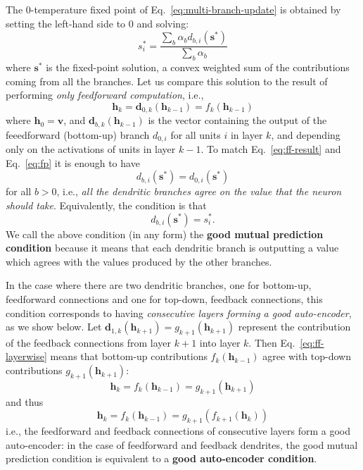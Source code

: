 \documentclass{article}
\newcommand   \vv{{\bm v}}
\newcommand   \vh{{\bm h}}
\newcommand   \vs{{\bm s}}
\newcommand   \vd{{\bm d}}
\begin{document}
The 0-temperature fixed point of Eq.~\ref{eq:multi-branch-update} is obtained
by setting the left-hand side to 0 and solving:
\begin{equation}
  \label{eq:fp}
  s^*_i = \frac{\sum_b \alpha_b d_{b,i}(\vs^*)}{\sum_b \alpha_b}
\end{equation}
where $\vs^*$ is the fixed-point solution, a convex weighted sum of the contributions
coming from all the branches.
Let us compare this solution to the result of performing {\em only feedforward
  computation}, i.e.,
\begin{equation}
  \label{eq:ff-result}
  \vh_k = \vd_{0,k}(\vh_{k-1}) = f_k(\vh_{k-1})
\end{equation}
where $\vh_0=\vv$, and $\vd_{b,k}(\vh_{k-1})$ is the vector
containing the output of the feeedforward (bottom-up) branch $d_{0,i}$ for all units $i$ in layer $k$,
and depending only on the activations of units in layer $k-1$.
To match Eq.~\ref{eq:ff-result} and Eq.~\ref{eq:fp} it is enough
to have
\begin{equation}
  \label{eq:ff-layerwise}
   d_{b,i}(\vs^*) = d_{0,i}(\vs^*)
\end{equation}
for all $b>0$, i.e., {\em all the dendritic branches agree on the
  value that the neuron should take}. Equivalently, the condition is that
\begin{equation}
  \label{eq:condition}
     d_{b,i}(\vs^*) = s^*_i.
\end{equation}
We call the above condition (in any form) the {\bf good mutual prediction condition}
because it means that each dendritic branch is outputting a value which agrees with
the values produced by the other branches.

In the case where there are two dendritic branches, one for bottom-up, feedforward connections
and one for top-down, feedback connections, this condition corresponds to having {\em consecutive layers
  forming a good auto-encoder}, as we show below. Let $\vd_{1,k}(\vh_{k+1}) = g_{k+1}(\vh_{k+1})$ represent the
contribution of the feedback connections from layer $k+1$ into layer $k$.
Then Eq.~\ref{eq:ff-layerwise} means that bottom-up contributions $f_k(\vh_{k-1})$ agree
with top-down contributions $g_{k+1}(\vh_{k+1})$:
\begin{equation}
  \vh_k = f_k(\vh_{k-1}) = g_{k+1}(\vh_{k+1})
\end{equation}
and thus
\begin{equation}
  \vh_k = f_k(\vh_{k-1}) = g_{k+1}(f_{k+1}(\vh_k))
\end{equation}
i.e., the feedforward and feedback connections of consecutive layers form a good auto-encoder:
in the case of feedforward and feedback dendrites, the good mutual prediction condition
is equivalent to a {\bf good auto-encoder condition}.
\end{document}
